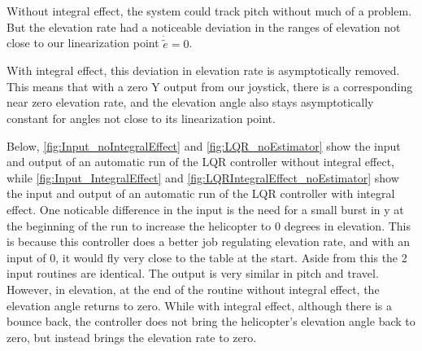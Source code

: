 Without integral effect, the system could track pitch without much of
a problem. But the elevation rate had a noticeable deviation in the
ranges of elevation not close to our linearization point
$\dot{\tilde{e}} = 0$.

With integral effect, this deviation in elevation rate is
asymptotically removed. This means that with a zero Y output from our
joystick, there is a corresponding near zero elevation rate, and the
elevation angle also stays asymptotically constant for angles not
close to its linearization point.

Below, \cref{fig:Input_noIntegralEffect} and
\cref{fig:LQR_noEstimator} show the input and output of an automatic
run of the LQR controller without integral effect, while
\cref{fig:Input_IntegralEffect} and
\cref{fig:LQRIntegralEffect_noEstimator} show the input and output of
an automatic run of the LQR controller with integral effect. One
noticable difference in the input is the need for a small burst in y
at the beginning of the run to increase the helicopter to 0 degrees in
elevation. This is because this controller does a better job
regulating elevation rate, and with an input of 0, it would fly very
close to the table at the start. Aside from this the 2 input routines
are identical. The output is very similar in pitch and
travel. However, in elevation, at the end of the routine without
integral effect, the elevation angle returns to zero. While with
integral effect, although there is a bounce back, the controller does
not bring the helicopter's elevation angle back to zero, but instead
brings the elevation rate to zero.

